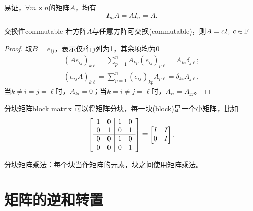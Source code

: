 易证，$\forall m\times n$的矩阵$A$，均有
\[
	I_mA=AI_n=A.
\]
\begin{theorem}{交换性}{commutable}
	若方阵$A$与任意方阵可交换(commutable)，则$A=cI,\;c\in\mathbb F$
\end{theorem}
\begin{proof}
	取$B=e_{ij}$，表示仅$i$行$j$列为1，其余项均为0
	\begin{align*}
		(Ae_{ij})_{k\ell}=\sum_{p=1}^nA_{kp}(e_{ij})_{p\ell}=A_{ki}\delta_{j\ell};\\
		(e_{ij}A)_{k\ell}=\sum_{p=1}^n(e_{ij})_{kp}A_{p\ell}=\delta_{ki}A_{j\ell},
	\end{align*}
	当$k\neq i=j=\ell$时，$A_{ki}=0$；当$k=i\neq j=\ell$时，$A_{ii}=A_{jj}$。
\end{proof}
\begin{definition}{分块矩阵}{block matrix}
	可以将矩阵分块，每一块(block)是一个小矩阵，比如
	\begin{align*}
		\left[\begin{array}{cc|cc}
			1&0&1&0\\
			0&1&0&1\\
			\hline
			0&0&1&0\\
			0&0&0&1	
		\end{array}\right]\equiv\begin{bmatrix}
			I&I\\0&I
		\end{bmatrix}.
	\end{align*}
\end{definition}
\begin{remark}
	分块矩阵乘法：每个块当作矩阵的元素，块之间使用矩阵乘法。
\end{remark}

\section{矩阵的逆和转置}

